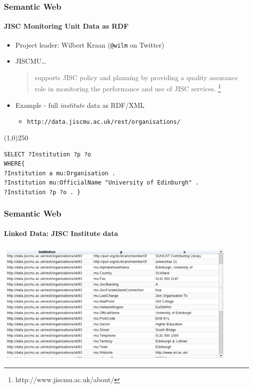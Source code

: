 \documentclass{beamer}
\begin{document}
\begin{frame}[fragile]
\frametitle{Semantic Web}
\framesubtitle{JISC Monitoring Unit Data as RDF}

\begin{itemize}
\item Project leader: Wilbert Kraan (\texttt{@wilm} on Twitter)
\item JISCMU\ldots

\begin{quotation}
supports JISC policy and planning by providing a quality assurance
role in monitoring the performance and use of JISC
services. \footnote{http://www.jiscmu.ac.uk/about/}
\end{quotation}

\item Example - full \emph{institute} data as RDF/XML

\begin{itemize}
\item \texttt{http://data.jiscmu.ac.uk/rest/organisations/}
\end{itemize}

\end{itemize}

\begin{center}
\line(1,0){250}
\end{center}

\begin{verbatim}
SELECT ?Institution ?p ?o
WHERE{ 
?Institution a mu:Organisation .
?Institution mu:OfficialName "University of Edinburgh" .
?Institution ?p ?o . }
\end{verbatim}

\end{frame}

\begin{frame}[fragile]
\frametitle{Semantic Web}
\framesubtitle{Linked Data: JISC Institute data}

\begin{center}
\includegraphics[width=120mm]{images/jisc-results.pdf}
\end{center}

\end{frame}
\end{document}
